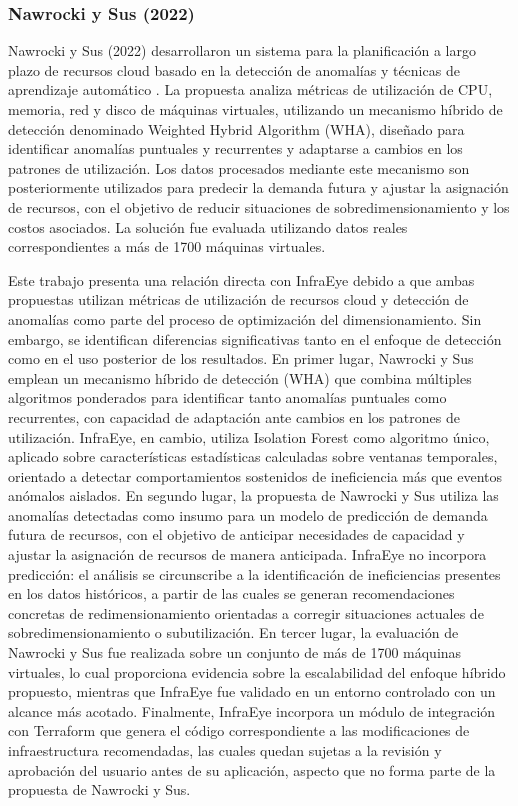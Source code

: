 \subsubsection{Nawrocki y Sus (2022)}

Nawrocki y Sus (2022) desarrollaron un sistema para la planificación a largo plazo de recursos cloud basado en la detección de anomalías y técnicas de aprendizaje automático \parencite{Nawrocki2022}. La propuesta analiza métricas de utilización de CPU, memoria, red y disco de máquinas virtuales, utilizando un mecanismo híbrido de detección denominado Weighted Hybrid Algorithm (WHA), diseñado para identificar anomalías puntuales y recurrentes y adaptarse a cambios en los patrones de utilización. Los datos procesados mediante este mecanismo son posteriormente utilizados para predecir la demanda futura y ajustar la asignación de recursos, con el objetivo de reducir situaciones de sobredimensionamiento y los costos asociados. La solución fue evaluada utilizando datos reales correspondientes a más de 1700 máquinas virtuales.

Este trabajo presenta una relación directa con InfraEye debido a que ambas propuestas utilizan métricas de utilización de recursos cloud y detección de anomalías como parte del proceso de optimización del dimensionamiento. Sin embargo, se identifican diferencias significativas tanto en el enfoque de detección como en el uso posterior de los resultados. En primer lugar, Nawrocki y Sus emplean un mecanismo híbrido de detección (WHA) que combina múltiples algoritmos ponderados para identificar tanto anomalías puntuales como recurrentes, con capacidad de adaptación ante cambios en los patrones de utilización. InfraEye, en cambio, utiliza Isolation Forest como algoritmo único, aplicado sobre características estadísticas calculadas sobre ventanas temporales, orientado a detectar comportamientos sostenidos de ineficiencia más que eventos anómalos aislados. En segundo lugar, la propuesta de Nawrocki y Sus utiliza las anomalías detectadas como insumo para un modelo de predicción de demanda futura de recursos, con el objetivo de anticipar necesidades de capacidad y ajustar la asignación de recursos de manera anticipada. InfraEye no incorpora predicción: el análisis se circunscribe a la identificación de ineficiencias presentes en los datos históricos, a partir de las cuales se generan recomendaciones concretas de redimensionamiento orientadas a corregir situaciones actuales de sobredimensionamiento o subutilización. En tercer lugar, la evaluación de Nawrocki y Sus fue realizada sobre un conjunto de más de 1700 máquinas virtuales, lo cual proporciona evidencia sobre la escalabilidad del enfoque híbrido propuesto, mientras que InfraEye fue validado en un entorno controlado con un alcance más acotado. Finalmente, InfraEye incorpora un módulo de integración con Terraform que genera el código correspondiente a las modificaciones de infraestructura recomendadas, las cuales quedan sujetas a la revisión y aprobación del usuario antes de su aplicación, aspecto que no forma parte de la propuesta de Nawrocki y Sus.

